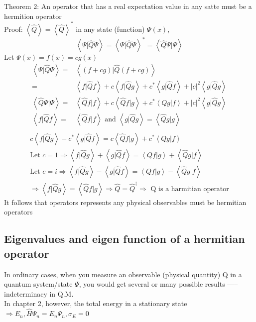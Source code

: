 \documentclass[12pt, a4paper]{article}
\begin{document}
Theorem 2: An operator that has a real expectation value in any satte must be a hermition operator\\
Proof: $\left<\hat{Q}\right>=\left<\hat{Q}\right>^*$ in any state (function) $\Psi(x)$, $$\left<\Psi|\hat{Q}\Psi\right>=\left<\Psi|\hat{Q}\Psi\right>^*=\left<\hat{Q}\Psi|\Psi\right>$$ Let $\Psi(x)=f(x)=cg(x)$
\begin{align*}
\left<\Psi|\hat{Q}\Psi\right>=&\left<(f+cg)|\hat{Q}(f+cg)\right>\\
=&\left<f|\hat{Q}f\right>+c\left<f|\hat{Q}g\right>+c^*\left<g|\hat{Q}f\right>+|c|^2\left<g|\hat{Q}g\right>\\
\left<\hat{Q}\Psi|\Psi\right>=&\left<\hat{Q}f|f\right>+c\left<\hat{Q}f|g\right>+c^*\left<Qg|f\right>+|c|^2\left<g|\hat{Q}g\right>\\
\left<f|\hat{Q}f\right>=&\left<\hat{Q}f|f\right> \text{ and } \left<g|\hat{Q}g\right>=\left<\hat{Q}g|g\right>\\
\end{align*}
\begin{align*}
c\left<f|\hat{Q}g\right>+c^*\left<g|\hat{Q}f\right>=c\left<\hat{Q}f|g\right>+c^*\left<Qg|f\right>\\
\text{Let } c=1\Rightarrow \left<f|\hat{Q}g\right>+\left<g|\hat{Q}f\right>=\left<Qf|g\right>+\left<\hat{Q}g|f\right>\\
\text{Let } c=i\Rightarrow \left<f|\hat{Q}g\right>-\left<g|\hat{Q}f\right>=\left<Qf|g\right>-\left<\hat{Q}g|f\right>\\
\Rightarrow \left<f|\hat{Q}g\right>=\left<\hat{Q}f|g\right>\Rightarrow \hat{Q}=\hat{Q}^{\dagger}\Rightarrow \text{ Q is a harmitian operator}
\end{align*}
It follows that operators represents any physical observables must be hermitian operators
\subsection{Eigenvalues and eigen function of a hermitian operator}
In ordinary cases, when you measure an observable (physical quantity) Q in a quantum system/state $\Psi$, you would get several or many possible results ----- indeterminacy in Q.M.\\
In chapter 2, however, the total energy in a stationary state $\Rightarrow E_n,\hat{H}\Psi_n=E_n\Psi_n,\sigma_E=0$ 
\end{document}
